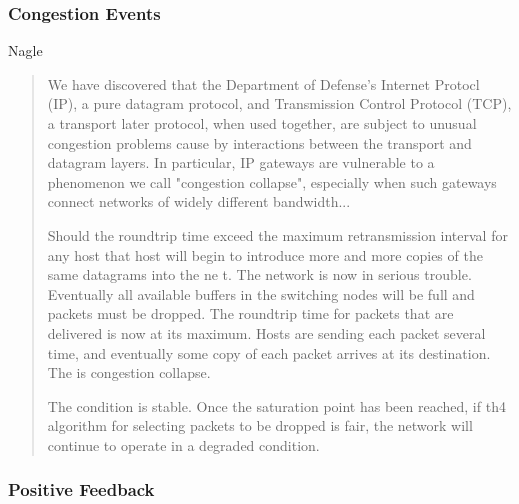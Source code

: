 


\subsubsection{Congestion Events}

Nagle \cite{rfc896}

\begin{quote}
We have discovered that the Department of Defense's Internet Protocl (IP), a pure datagram protocol,
and Transmission Control Protocol (TCP), a transport later protocol, when used together, are
subject to unusual congestion problems cause by interactions between the transport and datagram
layers. In particular, IP gateways are vulnerable to a phenomenon we call "congestion collapse",
especially when such gateways connect networks of widely different bandwidth...

Should the roundtrip time exceed the maximum retransmission interval for any host that host will
begin to introduce more and more copies of the same datagrams into the ne t. The network is now
in serious trouble. Eventually all available buffers in the switching nodes will be full and
packets must be dropped. The roundtrip time for packets that are delivered is now at its
maximum. Hosts are sending each packet several time, and eventually some copy of each packet
arrives at its destination. The is congestion collapse.

The condition is stable. Once the saturation point has been reached, if th4 algorithm for selecting
packets to be dropped is fair, the network will continue to operate in a degraded condition.
\end{quote}


\subsubsection{Positive Feedback}


